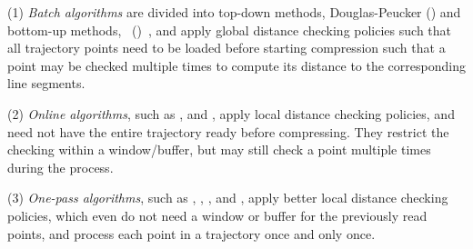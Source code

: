 \sstab (1) {\em Batch algorithms} are divided into top-down methods, \eg Douglas-Peucker (\dpa) \cite{Douglas:Peucker,Meratnia:Spatiotemporal} and bottom-up methods, \eg\ \pavlidis (\tpa)~\cite{Pavlidis:Segment}, and apply global distance checking policies such that all trajectory points need to be loaded before starting compression such that a point may be checked multiple times to compute its distance to the corresponding line segments.

\sstab (2) {\em Online algorithms}, such as \opwa \cite{Meratnia:Spatiotemporal}, \squishe \cite{Muckell:Compression} and \bqsa \cite{Liu:BQS}, apply local distance checking policies, and need not have the entire trajectory ready before compressing. They restrict the checking within a window/buffer, but may still check a point  multiple times during the process.

\sstab (3) {\em One-pass algorithms}, such as \operb\cite{Lin:Operb}, \siped \cite{Williams:Longest,Sklansky:Cone,Dunham:Cone, Zhao:Sleeve}, \cised \cite{Lin:Cised}, \intersec\cite{Long:Direction} and \interval \cite{Ke:Interval}, apply better local distance checking policies, which even do not need a window or buffer for the previously read points, and process each point in a trajectory once and only once.




